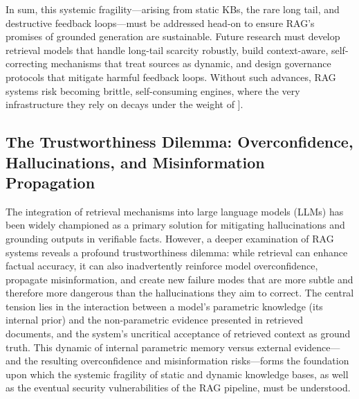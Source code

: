 \documentclass[11pt]{article}
\begin{document}
In sum, this systemic fragility---arising from static KBs, the rare long tail, and destructive feedback loops---must be addressed head-on to ensure RAG's promises of grounded generation are sustainable. Future research must develop retrieval models that handle long-tail scarcity robustly, build context-aware, self-correcting mechanisms that treat sources as dynamic, and design governance protocols that mitigate harmful feedback loops. Without such advances, RAG systems risk becoming brittle, self-consuming engines, where the very infrastructure they rely on decays under the weight of \cite{ref247}{]}.

\subsection{The Trustworthiness Dilemma: Overconfidence, Hallucinations, and Misinformation Propagation}

The integration of retrieval mechanisms into large language models (LLMs) has been widely championed as a primary solution for mitigating hallucinations and grounding outputs in verifiable facts. However, a deeper examination of RAG systems reveals a profound trustworthiness dilemma: while retrieval can enhance factual accuracy, it can also inadvertently reinforce model overconfidence, propagate misinformation, and create new failure modes that are more subtle and therefore more dangerous than the hallucinations they aim to correct. The central tension lies in the interaction between a model's parametric knowledge (its internal prior) and the non-parametric evidence presented in retrieved documents, and the system's uncritical acceptance of retrieved context as ground truth. This dynamic of internal parametric memory versus external evidence---and the resulting overconfidence and misinformation risks---forms the foundation upon which the systemic fragility of static and dynamic knowledge bases, as well as the eventual security vulnerabilities of the RAG pipeline, must be understood.
\end{document}
